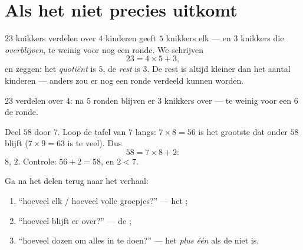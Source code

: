 \section{Als het niet precies uitkomt}

\begin{definition}[Rest]\label{def:g3:division:remainder}
$23$ knikkers verdelen over $4$ kinderen geeft $5$ knikkers elk --- en
$3$ knikkers die \emph{overblijven}, te weinig voor nog een ronde. We
schrijven
\[
23 = 4 \times 5 + 3 ,
\]
en zeggen: het \emph{quotiënt} is $5$, de
\emph{rest} is $3$. De rest is altijd kleiner dan het aantal
kinderen --- anders zou er nog een ronde verdeeld kunnen worden.
\end{definition}

\begin{omfigure}

{\small $23$ verdelen over $4$: na $5$ ronden blijven er $3$ knikkers
over --- te weinig voor een $6$de ronde.}
\end{omfigure}

\begin{example}\label{ex:g3:division:remainder}
Deel $58$ door $7$. Loop de tafel van $7$ langs: $7 \times 8 = 56$ is het
grootste  dat onder $58$ blijft ($7 \times 9 = 63$ is te veel).
Dus
\[
58 = 7 \times 8 + 2 :
\]
 $8$,  $2$. Controle: $56 + 2 = 58$, en $2 < 7$.
\end{example}

\begin{method}\label{met:g3:division:interpret}
Ga na het delen terug naar het verhaal:
\begin{enumerate}
  \item ``hoeveel elk / hoeveel volle groepjes?'' --- het ;
  \item ``hoeveel blijft er over?'' --- de ;
  \item ``hoeveel dozen om alles in te doen?'' --- het 
        \emph{plus één} als de  niet  is.
\end{enumerate}
\end{method}

